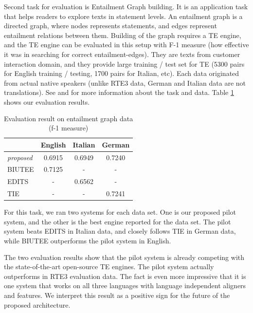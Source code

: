 \documentclass[11pt,letterpaper]{article}
\begin{document}
Second task for evaluation is Entailment Graph building. It is an
application task that helps readers to explore texts in statement
levels. An entailment graph is a directed graph, where nodes
represents statements, and edges represent entailment relations
between them. Building of the graph requires a TE engine, and the TE
engine can be evaluated in this setup with F-1 measure (how effective
it was in searching for correct entailment-edges). They are texts from
customer interaction domain, and they provide large training / test
set for TE (5300 pairs for English training / testing, 1700 pairs for
Italian, etc). Each data originated from actual native speakers
(unlike RTE3 data, German and Italian data are not translations). See
\cite{} and \cite{} for more information about the task and data.  
Table \ref{table:egraph} shows our evaluation results.      

\begin{table}[t!]
\centering
\small
\begin{tabular}{l|ccc}
              &   English    &   Italian   &  German  \\
\hline
{\em proposed}&   0.6915     &   0.6949    &   0.7240  \\
BIUTEE        &   0.7125     &     -       &     -     \\
EDITS         &      -       &   0.6562    &     -     \\
TIE           &      -       &     -       &   0.7241  \\ 
\end{tabular}
\caption{Evaluation result on entailment graph data (f-1 measure)}
\label{table:egraph}
\end{table}

For this task, we ran two systems for each data set. One is our
proposed pilot system, and the other is the best engine reported
for the data set. The pilot system beats EDITS in Italian data, and
closely follows TIE in German data, while BIUTEE outperforms the pilot
system in English.  

The two evaluation results show that the pilot system is already
competing with the state-of-the-art open-source TE engines. The pilot
system actually outperforms in RTE3 evaluation data. The fact is even
more impressive that it is one system that works on all three
languages with language independent aligners and features. We
interpret this result as a positive sign for the future of the
proposed architecture.      
\end{document}
